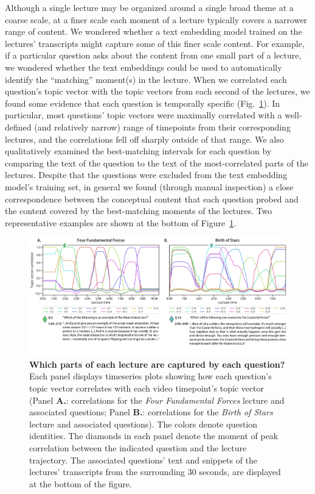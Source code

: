\documentclass[10pt]{article}
\begin{document}
Although a single lecture may be organized around a single broad theme at a
coarse scale, at a finer scale each moment of a lecture typically covers a
narrower range of content. We wondered whether a text embedding model trained
on the lectures' transcripts might capture some of this finer scale content.
For example, if a particular question asks about the content from one small
part of a lecture, we wondered whether the text embeddings could be used to
automatically identify the ``matching'' moment(s) in the lecture. When we
correlated each question's topic vector with the topic vectors from each second
of the lectures, we found some evidence that each question is temporally
specific (Fig.~\ref{fig:question-correlations}). In particular, most questions'
topic vectors were maximally correlated with a well-defined (and relatively
narrow) range of timepoints from their corresponding lectures, and the
correlations fell off sharply outside of that range. We also qualitatively examined the
best-matching intervals for each question by comparing the text
of the question to the text of the most-correlated parts of the lectures.
Despite that the questions were excluded from the text embedding model's
training set, in general we found (through manual inspection) a close
correspondence between the conceptual content that each question probed and
the content covered by the best-matching moments of the lectures. Two
representative examples are shown at the bottom of
Figure~\ref{fig:question-correlations}.

\begin{figure}[tp] \centering
\includegraphics[width=\textwidth]{figs/lecture-question-similarity}

\caption{\textbf{Which parts of each lecture are captured by each question?}
Each panel displays timeseries plots showing how each question's topic vector
correlates with each video timepoint's topic vector (Panel \textbf{A.}:
correlations for the \textit{Four Fundamental Forces} lecture and associated
questions; Panel \textbf{B.}: correlations for the \textit{Birth of Stars}
lecture and associated questions). The colors denote question identities. The
diamonds in each panel denote the moment of peak correlation between the
indicated question and the lecture trajectory. The associated questions' text
and snippets of the lectures' transcripts from the surrounding 30 seconds, are
displayed at the bottom of the figure.}

    \label{fig:question-correlations}
\end{figure}
\end{document}
